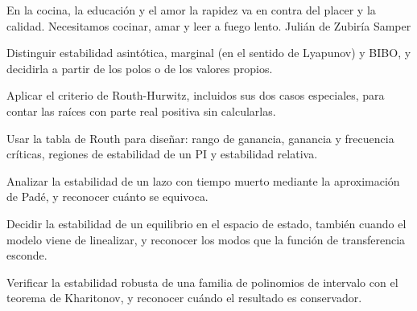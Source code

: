 
  {En la cocina, la educación y el amor la rapidez va en contra del placer y la calidad. Necesitamos cocinar, amar y leer a fuego lento.}
  {Julián de Zubiría Samper}

\begin{objetivos}
  \item Distinguir estabilidad asintótica, marginal (en el sentido de Lyapunov) y BIBO, y decidirla a partir de los polos o de los valores propios.
  \item Aplicar el criterio de Routh-Hurwitz, incluidos sus dos casos especiales, para contar las raíces con parte real positiva sin calcularlas.
  \item Usar la tabla de Routh para diseñar: rango de ganancia, ganancia y frecuencia críticas, regiones de estabilidad de un PI y estabilidad relativa.
  \item Analizar la estabilidad de un lazo con tiempo muerto mediante la aproximación de Padé, y reconocer cuánto se equivoca.
  \item Decidir la estabilidad de un equilibrio en el espacio de estado, también cuando el modelo viene de linealizar, y reconocer los modos que la función de transferencia esconde.
  \item Verificar la estabilidad robusta de una familia de polinomios de intervalo con el teorema de Kharitonov, y reconocer cuándo el resultado es conservador.
\end{objetivos}










